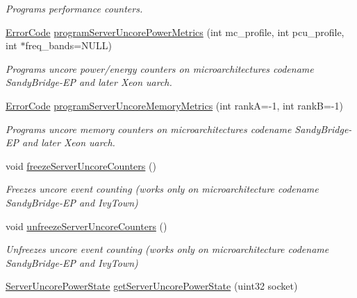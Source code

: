 \begin{DoxyCompactItemize}
\begin{DoxyCompactList}\small\item\em Programs performance counters. \end{DoxyCompactList}\item 
\mbox{\hyperlink{class_p_c_m_abebf5f22d794719dfc49155741e264e5}{Error\+Code}} \mbox{\hyperlink{class_p_c_m_a3a30cec6e4e7a78ec964d194e3844637}{program\+Server\+Uncore\+Power\+Metrics}} (int mc\+\_\+profile, int pcu\+\_\+profile, int $\ast$freq\+\_\+bands=N\+U\+LL)
\begin{DoxyCompactList}\small\item\em Programs uncore power/energy counters on microarchitectures codename Sandy\+Bridge-\/\+EP and later Xeon uarch. \end{DoxyCompactList}\item 
\mbox{\hyperlink{class_p_c_m_abebf5f22d794719dfc49155741e264e5}{Error\+Code}} \mbox{\hyperlink{class_p_c_m_aa2263c70dabe237a8aeb9cdc58736ee5}{program\+Server\+Uncore\+Memory\+Metrics}} (int rankA=-\/1, int rankB=-\/1)
\begin{DoxyCompactList}\small\item\em Programs uncore memory counters on microarchitectures codename Sandy\+Bridge-\/\+EP and later Xeon uarch. \end{DoxyCompactList}\item 
\mbox{\label{class_p_c_m_a9f142010bb99ba6b81e93895bfa20252}} 
void \mbox{\hyperlink{class_p_c_m_a9f142010bb99ba6b81e93895bfa20252}{freeze\+Server\+Uncore\+Counters}} ()
\begin{DoxyCompactList}\small\item\em Freezes uncore event counting (works only on microarchitecture codename Sandy\+Bridge-\/\+EP and Ivy\+Town) \end{DoxyCompactList}\item 
\mbox{\label{class_p_c_m_a617beda55da4de32593a7aa925fe1f02}} 
void \mbox{\hyperlink{class_p_c_m_a617beda55da4de32593a7aa925fe1f02}{unfreeze\+Server\+Uncore\+Counters}} ()
\begin{DoxyCompactList}\small\item\em Unfreezes uncore event counting (works only on microarchitecture codename Sandy\+Bridge-\/\+EP and Ivy\+Town) \end{DoxyCompactList}\item 
\mbox{\hyperlink{class_server_uncore_power_state}{Server\+Uncore\+Power\+State}} \mbox{\hyperlink{class_p_c_m_a9db0d472d9cdc0aa3c6db8ed7bb38f77}{get\+Server\+Uncore\+Power\+State}} (uint32 socket)

\end{DoxyCompactItemize}
